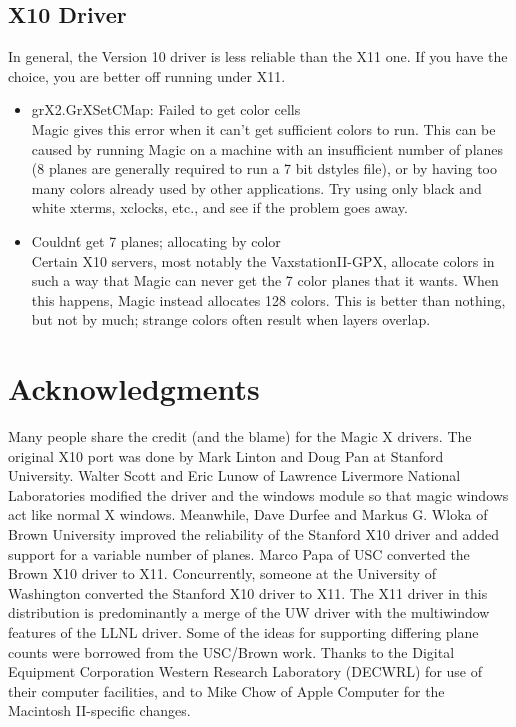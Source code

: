 \documentclass[letterpaper,twoside,12pt]{article}
\begin{document}
\subsection{X10 Driver}

In general, the Version 10 driver is less reliable than the X11 one.
If you have the choice, you are better off running under X11.

\begin{itemize}
\item grX2.GrXSetCMap: Failed to get color cells \\
Magic gives this
error when it can't get sufficient colors to run.  This can be caused
by running Magic on a machine with an insufficient number of planes
(8 planes are generally required to run a 7 bit dstyles file), or by 
having too many colors already used by other applications.  Try 
using only black and white xterms, xclocks, etc., and see if the problem 
goes away.

\item Couldn\'t get 7 planes; allocating by color \\
Certain X10 servers, 
most notably the VaxstationII-GPX, allocate colors in such a way that 
Magic can never get the 7 color planes that it wants.  When this 
happens, Magic instead allocates 128 colors. This is better than nothing, 
but not by much; strange colors often result when layers overlap. 
\end{itemize}

\section{Acknowledgments}

Many people share the credit (and the blame) for the Magic X drivers.   
The original X10 port was done by Mark Linton and Doug Pan at Stanford 
University.  Walter Scott and Eric Lunow of Lawrence Livermore 
National Laboratories modified the driver and the windows module 
so that magic windows act like normal X windows.  Meanwhile, Dave Durfee and
Markus G. Wloka of Brown University improved the reliability of the Stanford 
X10  driver and added support for a variable number of planes.  Marco Papa 
of USC converted the Brown X10 driver to X11.  Concurrently, someone at 
the University of Washington converted the Stanford X10 driver to X11.  
The X11 driver in this distribution is predominantly a merge of the UW 
driver with the multiwindow features of the LLNL driver.  Some of the ideas
for supporting differing plane counts were borrowed from the USC/Brown work.
Thanks to the Digital Equipment Corporation Western Research Laboratory 
(DECWRL) for use of their computer facilities, and to Mike Chow of 
Apple Computer for the Macintosh II-specific changes.
\end{document}
